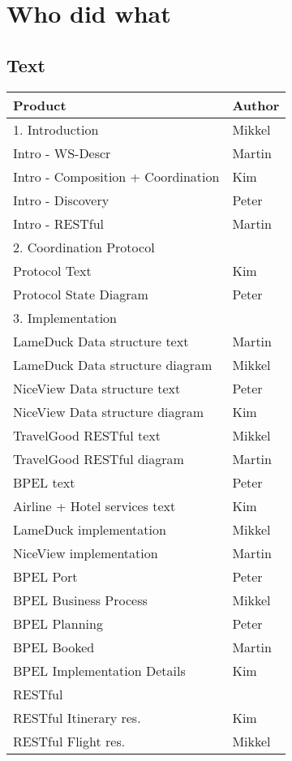 \chapter{Who did what}
\section{Text}
\begin{tabular}{|l|l|}
\hline \textbf{Product} & \textbf{Author} \\ \hline
\hline 1. Introduction & Mikkel \\ 
\hline Intro - WS-Descr & Martin \\ 
\hline Intro - Composition + Coordination & Kim \\ 
\hline Intro - Discovery & Peter  \\ 
\hline Intro - RESTful & Martin  \\ 
\hline 2. Coordination Protocol &  \\ 
\hline Protocol Text & Kim \\ 
\hline Protocol State Diagram & Peter \\ 
\hline 3. Implementation &  \\ 
\hline LameDuck Data structure text & Martin \\ 
\hline LameDuck Data structure diagram & Mikkel \\ 
\hline NiceView Data structure text & Peter  \\ 
\hline NiceView Data structure diagram & Kim \\ 
\hline TravelGood RESTful text & Mikkel \\ 
\hline TravelGood RESTful diagram & Martin  \\ 
\hline BPEL text & Peter \\ 
\hline Airline + Hotel services text & Kim  \\ 
\hline LameDuck implementation & Mikkel \\ 
\hline NiceView implementation & Martin \\ 
\hline BPEL Port & Peter \\ 
\hline BPEL Business Process & Mikkel  \\ 
\hline BPEL Planning & Peter  \\ 
\hline BPEL Booked & Martin \\ 
\hline BPEL Implementation Details & Kim \\ 
\hline RESTful &  \\ 
\hline RESTful Itinerary res. &  Kim \\ 
\hline RESTful Flight res. & Mikkel \\ 

\end{tabular}
